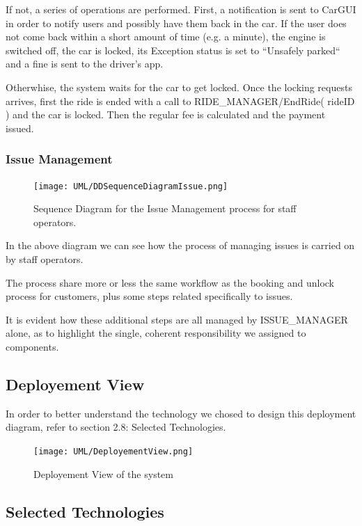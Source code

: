 \documentclass[11pt]{article} %
\begin{document}
If not, a series of operations are performed. First, a notification is sent to CarGUI in order to notify users and possibly have them back in the car. If the user does not come back within a short amount of time (e.g. a minute), the engine is switched off, the car is locked, its Exception status is set to ``Unsafely parked`` and a fine is sent to the driver's app.

Otherwhise, the system waits for the car to get locked. Once the locking requests arrives, first the ride is ended with a call to RIDE\_MANAGER/EndRide( rideID ) and the car is locked. Then the regular fee is calculated and the payment issued.


\subsubsection{Issue Management}
\begin{figure}[H]
	\centering
	\texttt{[image: UML/DDSequenceDiagramIssue.png]}
	\caption{Sequence Diagram for the Issue Management process for staff operators.}
\end{figure}

In the above diagram we can see how the process of managing issues is carried on by staff operators.

The process share more or less the same workflow as the booking and unlock process for customers, plus some steps related specifically to issues.

It is evident how these additional steps are all managed by ISSUE\_MANAGER alone, as to highlight the single, coherent responsibility we assigned to components.


\subsection{Deployement View}

In order to better understand the technology we chosed to design this deployment diagram, refer to section 2.8: Selected Technologies.

\begin{figure}[H]
	\centering
	\texttt{[image: UML/DeployementView.png]}
	\caption{Deployement View of the system}
\end{figure}



\subsection{Selected Technologies}
\end{document}
